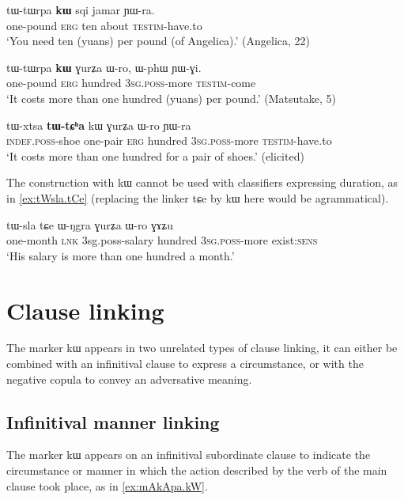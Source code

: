\documentclass[oldfontcommands,oneside,a4paper,11pt]{article}
\newcommand{\ipa}[1]{{\phon #1}} %
\begin{document}
 \begin{exe} 
\ex \label{ex:tWtWrpa.kW1}
\gll  
\ipa{tɯ-tɯrpa} 	\ipa{\textbf{kɯ}} 	\ipa{sqi} 	\ipa{jamar} 	\ipa{ɲɯ-ra.} 	\\
one-pound \textsc{erg} ten about \textsc{testim}-have.to \\
\glt `You need ten (yuans) per pound (of Angelica).' (Angelica, 22)
\end{exe}  

 \begin{exe} 
\ex \label{ex:tWtWrpa.kW2}
\gll  
\ipa{tɯ-tɯrpa}  	\ipa{\textbf{kɯ}}  	\ipa{ɣurʑa}  	\ipa{ɯ-ro,}  	\ipa{ɯ-phɯ}  	\ipa{ɲɯ-ɣi.}  \\
one-pound \textsc{erg} hundred \textsc{3sg.poss}-more \textsc{testim}-come \\
\glt `It costs more than one hundred (yuans) per pound.' (Matsutake, 5)
\end{exe}  
  \begin{exe} 
\ex \label{ex:tWtCha.kW}
\gll  
\ipa{tɯ-xtsa} 	\ipa{\textbf{tɯ-tɕʰa}} 	\ipa{kɯ} 	\ipa{ɣurʑa} 	\ipa{ɯ-ro} 	\ipa{ɲɯ-ra} \\
\textsc{indef.poss}-shoe one-pair \textsc{erg} hundred \textsc{3sg.poss}-more \textsc{testim}-have.to \\
 \glt  `It costs more than one hundred for a pair of shoes.' (elicited)
\end{exe}  
The construction with \ipa{kɯ} cannot be used with classifiers expressing duration, as in \ref{ex:tWsla.tCe} (replacing the linker \ipa{tɕe} by \ipa{kɯ} here would be agrammatical).
 
 \begin{exe} 
\ex \label{ex:tWsla.tCe}
\gll  
  \ipa{tɯ-sla} \ipa{tɕe} \ipa{ɯ-ŋgra} \ipa{ɣurʑa} \ipa{ɯ-ro} \ipa{ɣɤʑu} \\
  one-month \textsc{lnk} 3sg.poss-salary hundred \textsc{3sg.poss}-more exist:\textsc{sens} \\
  \glt `His salary is more than one hundred a month.'
  \end{exe}  
 \section{Clause linking} \label{sec:linking}
 The marker \ipa{kɯ} appears in two unrelated types of clause linking, it can either be combined with an infinitival clause to express a circumstance, or with the negative copula to convey an adversative meaning.
 
 \subsection{Infinitival manner linking} \label{sec:manner}
The marker \ipa{kɯ}  appears on an infinitival subordinate clause  to indicate the circumstance or manner in which the action described by the verb of the main clause took place, as in \ref{ex:mAkApa.kW}. 
\end{document}
